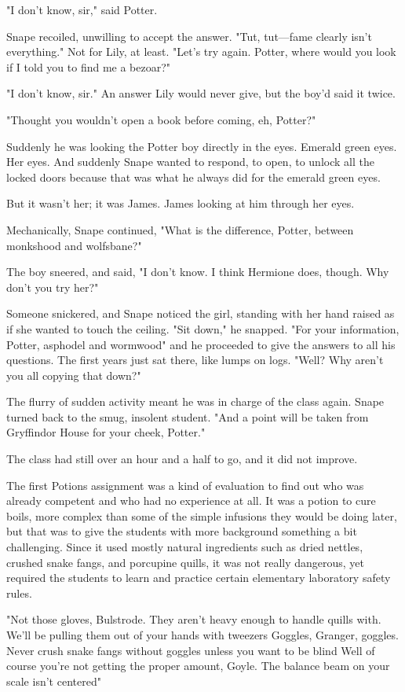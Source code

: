 "I don't know, sir," said Potter.

Snape recoiled, unwilling to accept the answer. "Tut, tut—fame clearly isn't everything." Not for Lily, at least. "Let's try again. Potter, where would you look if I told you to find me a bezoar?"

"I don't know, sir." An answer Lily would never give, but the boy'd said it twice.

"Thought you wouldn't open a book before coming, eh, Potter?"

Suddenly he was looking the Potter boy directly in the eyes. Emerald green eyes. Her eyes. And suddenly Snape wanted to respond, to open, to unlock all the locked doors because that was what he always did for the emerald green eyes.

But it wasn't her; it was James. James looking at him through her eyes.

Mechanically, Snape continued, "What is the difference, Potter, between monkshood and wolfsbane?"

The boy sneered, and said, "I don't know. I think Hermione does, though. Why don't you try her?"

Someone snickered, and Snape noticed the girl, standing with her hand raised as if she wanted to touch the ceiling. "Sit down," he snapped. "For your information, Potter, asphodel and wormwood{\el}" and he proceeded to give the answers to all his questions. The first years just sat there, like lumps on logs. "Well? Why aren't you all copying that down?"

The flurry of sudden activity meant he was in charge of the class again. Snape turned back to the smug, insolent student. "And a point will be taken from Gryffindor House for your cheek, Potter."

The class had still over an hour and a half to go, and it did not improve.

The first Potions assignment was a kind of evaluation to find out who was already competent and who had no experience at all. It was a potion to cure boils, more complex than some of the simple infusions they would be doing later, but that was to give the students with more background something a bit challenging. Since it used mostly natural ingredients such as dried nettles, crushed snake fangs, and porcupine quills, it was not really dangerous, yet required the students to learn and practice certain elementary laboratory safety rules.

"Not those gloves, Bulstrode. They aren't heavy enough to handle quills with. We'll be pulling them out of your hands with tweezers{\el} Goggles, Granger, goggles. Never crush snake fangs without goggles unless you want to be blind{\el} Well of course you're not getting the proper amount, Goyle. The balance beam on your scale isn't centered{\el}"


